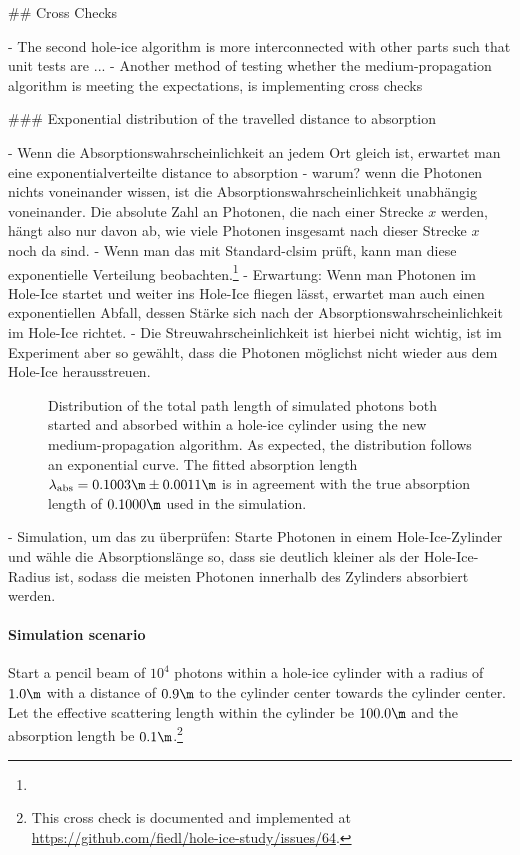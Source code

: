 
## Cross Checks

- The second hole-ice algorithm is more interconnected with other parts such that unit tests are ...
- Another method of testing whether the medium-propagation algorithm is meeting the expectations, is implementing cross checks

### Exponential distribution of the travelled distance to absorption

- Wenn die Absorptionswahrscheinlichkeit an jedem Ort gleich ist, erwartet man eine exponentialverteilte distance to absorption
- warum? wenn die Photonen nichts voneinander wissen, ist die Absorptionswahrscheinlichkeit unabhängig voneinander. Die absolute Zahl an Photonen, die nach einer Strecke $x$ werden, hängt also nur davon ab, wie viele Photonen insgesamt nach dieser Strecke $x$ noch da sind.
- Wenn man das mit Standard-clsim prüft, kann man diese exponentielle Verteilung beobachten.\footnote{}
- Erwartung: Wenn man Photonen im Hole-Ice startet und weiter ins Hole-Ice fliegen lässt, erwartet man auch einen exponentiellen Abfall, dessen Stärke sich nach der Absorptionswahrscheinlichkeit im Hole-Ice richtet.
- Die Streuwahrscheinlichkeit ist hierbei nicht wichtig, ist im Experiment aber so gewählt, dass die Photonen möglichst nicht wieder aus dem Hole-Ice herausstreuen.

\begin{figure}
  \caption{Distribution of the total path length of simulated photons both started and absorbed within a hole-ice cylinder using the new medium-propagation algorithm. As expected, the distribution follows an exponential curve. The fitted absorption length $\lambda_\text{abs}=0.1003\m \pm 0.0011\m$ is in agreement with the true absorption length of $0.1000\m$ used in the simulation.}
\end{figure}

- Simulation, um das zu überprüfen: Starte Photonen in einem Hole-Ice-Zylinder und wähle die Absorptionslänge so, dass sie deutlich kleiner als der Hole-Ice-Radius ist, sodass die meisten Photonen innerhalb des Zylinders absorbiert werden.

\paragraph{Simulation scenario} Start a pencil beam of $10^4$ photons within a hole-ice cylinder with a radius of $1.0\m$ with a distance of $0.9\m$ to the cylinder center towards the cylinder center. Let the effective scattering length within the cylinder be $100.0\m$ and the absorption length be $0.1\m$.\footnote{This cross check is documented and implemented at \url{https://github.com/fiedl/hole-ice-study/issues/64}.}

